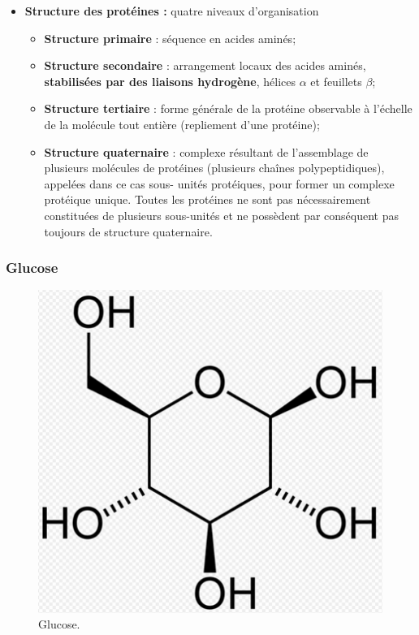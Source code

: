 \documentclass[11pt,a4paper]{report}
\begin{document}
\begin{itemize}
	\item \textbf{Structure des protéines :} quatre niveaux d'organisation
	\begin{itemize}
		\item \textbf{Structure primaire} : séquence en acides aminés;
		\item \textbf{Structure secondaire} : arrangement locaux des acides aminés, 								\textbf{stabilisées par des liaisons hydrogène}, hélices $\alpha$ et feuillets $\beta$;
		\item \textbf{Structure tertiaire} : forme générale de la protéine observable à l'échelle de 				la molécule tout entière (repliement d'une protéine);
		\item \textbf{Structure quaternaire} : complexe résultant de l'assemblage de plusieurs 						molécules de protéines (plusieurs chaînes polypeptidiques), appelées dans ce cas sous-					unités protéiques, pour former un complexe protéique unique. Toutes les protéines ne sont 			pas nécessairement constituées de plusieurs sous-unités et ne possèdent par conséquent 					pas toujours de structure quaternaire.
	\end{itemize}
\end{itemize}

\subsubsection*{Glucose}
\begin{figure}[h!]
	\begin{center}
  		\includegraphics[scale = 0.4]{glucose.png}
	\caption{Glucose.}
	\end{center}
\end{figure}
\end{document}
